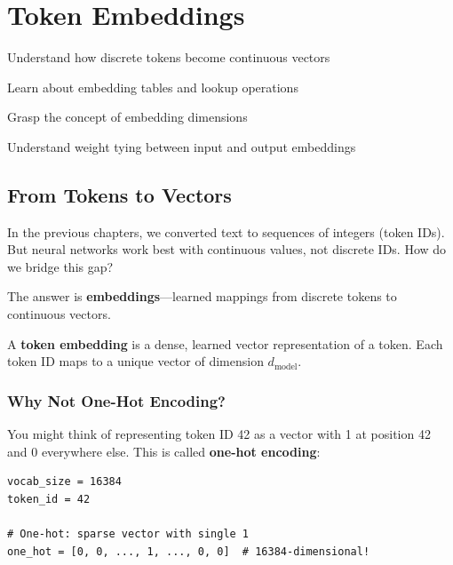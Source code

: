 \chapter{Token Embeddings}
\label{ch:token-embeddings}

\begin{objectives}
    \item Understand how discrete tokens become continuous vectors
    \item Learn about embedding tables and lookup operations
    \item Grasp the concept of embedding dimensions
    \item Understand weight tying between input and output embeddings
\end{objectives}

\section{From Tokens to Vectors}

In the previous chapters, we converted text to sequences of integers (token IDs). But neural networks work best with continuous values, not discrete IDs. How do we bridge this gap?

The answer is \textbf{embeddings}---learned mappings from discrete tokens to continuous vectors.

\begin{definition}[title=Token Embedding]
A \textbf{token embedding} is a dense, learned vector representation of a token. Each token ID maps to a unique vector of dimension $d_{\text{model}}$.
\end{definition}

\subsection{Why Not One-Hot Encoding?}

You might think of representing token ID 42 as a vector with 1 at position 42 and 0 everywhere else. This is called \textbf{one-hot encoding}:

\begin{lstlisting}[style=python]
vocab_size = 16384
token_id = 42

# One-hot: sparse vector with single 1
one_hot = [0, 0, ..., 1, ..., 0, 0]  # 16384-dimensional!
\end{lstlisting}

